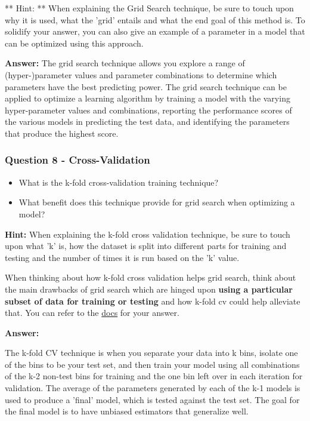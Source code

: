 \documentclass[11pt]{article}
\begin{document}
** Hint: ** When explaining the Grid Search technique, be sure to touch
upon why it is used, what the 'grid' entails and what the end goal of
this method is. To solidify your answer, you can also give an example of
a parameter in a model that can be optimized using this approach.

    \textbf{Answer: } The grid search technique allows you explore a range
of (hyper-)parameter values and parameter combinations to determine
which parameters have the best predicting power. The grid search
technique can be applied to optimize a learning algorithm by training a
model with the varying hyper-parameter values and combinations,
reporting the performance scores of the various models in predicting the
test data, and identifying the parameters that produce the highest
score.

    \subsubsection{Question 8 -
Cross-Validation}\label{question-8---cross-validation}

\begin{itemize}
\item
  What is the k-fold cross-validation training technique?
\item
  What benefit does this technique provide for grid search when
  optimizing a model?
\end{itemize}

\textbf{Hint:} When explaining the k-fold cross validation technique, be
sure to touch upon what 'k' is, how the dataset is split into different
parts for training and testing and the number of times it is run based
on the 'k' value.

When thinking about how k-fold cross validation helps grid search, think
about the main drawbacks of grid search which are hinged upon
\textbf{using a particular subset of data for training or testing} and
how k-fold cv could help alleviate that. You can refer to the
\href{http://scikit-learn.org/stable/modules/cross_validation.html\#cross-validation}{docs}
for your answer.

    \textbf{Answer: }

The k-fold CV technique is when you separate your data into k bins,
isolate one of the bins to be your test set, and then train your model
using all combinations of the k-2 non-test bins for training and the one
bin left over in each iteration for validation. The average of the
parameters generated by each of the k-1 models is used to produce a
'final' model, which is tested against the test set. The goal for the
final model is to have unbiased estimators that generalize well.
\end{document}
